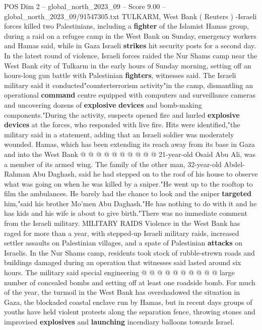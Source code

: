 \begin{textsample}{POS Dim 2 – global\_north\_2023\_09 – Score 9.00 – global\_north\_2023\_09/91547305.txt}  \label{ex:f2_pos_136}
TULKARM, West Bank ( Reuters ) -Israeli forces killed two Palestinians, including a \textbf{fighter} of the Islamist Hamas group, during a raid on a refugee camp in the West Bank on Sunday, emergency workers and Hamas said, while in Gaza Israeli \textbf{strikes} hit security posts for a second day.
In the latest round of violence, Israeli forces raided the Nur Shams camp near the West Bank city of Tulkarm in the early hours of Sunday morning, setting off an hours-long gun battle with Palestinian \textbf{fighters}, witnesses said.
The Israeli military said it conducted"counterterrorism activity"in the camp, dismantling an operational \textbf{command} centre equipped with computers and surveillance cameras and uncovering dozens of \textbf{explosive} \textbf{devices} and bomb-making components."During the activity, suspects opened fire and hurled \textbf{explosive} \textbf{devices} at the forces, who responded with live fire.
Hits were identified,"the military said in a statement, adding that an Israeli soldier was moderately wounded.
Hamas, which has been extending its reach away from its base in Gaza and into the West Bank @ @ @ @ @ @ @ @ @ @ 21-year-old Osaid Abu Ali, was a member of its armed wing.
The family of the other man, 32-year-old Abdel-Rahman Abu Daghash, said he had stepped on to the roof of his house to observe what was going on when he was killed by a sniper."He went up to the rooftop to film the ambulances.
He barely had the chance to look and the sniper \textbf{targeted} him,"said his brother Mo'men Abu Daghash."He has nothing to do with it and he has kids and his wife is about to give birth."There was no immediate comment from the Israeli military.
MILITARY RAIDS Violence in the West Bank has raged for more than a year, with stepped-up Israeli military raids, increased settler assaults on Palestinian villages, and a spate of Palestinian \textbf{attacks} on Israelis.
In the Nur Shams camp, residents took stock of rubble-strewn roads and buildings damaged during an operation that witnesses said lasted around six hours.
The military said special engineering @ @ @ @ @ @ @ @ @ @ large number of concealed bombs and setting off at least one roadside bomb.
For much of the year, the turmoil in the West Bank has overshadowed the situation in Gaza, the blockaded coastal enclave run by Hamas, but in recent days groups of youths have held violent protests along the separation fence, throwing stones and improvised \textbf{explosives} and \textbf{launching} incendiary balloons towards Israel.

\end{textsample}
